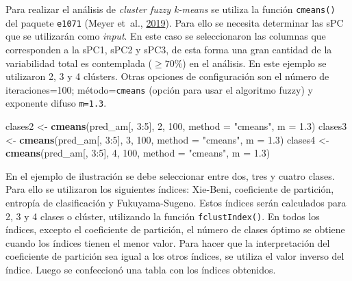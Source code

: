 \documentclass[11pt,b5paper,]{krantz}
\newenvironment{Shaded}{}{}
\newcommand{\DataTypeTok}[1]{\textcolor[rgb]{0.56,0.13,0.00}{#1}}
\newcommand{\DecValTok}[1]{\textcolor[rgb]{0.25,0.63,0.44}{#1}}
\newcommand{\FloatTok}[1]{\textcolor[rgb]{0.25,0.63,0.44}{#1}}
\newcommand{\KeywordTok}[1]{\textcolor[rgb]{0.00,0.44,0.13}{\textbf{#1}}}
\newcommand{\NormalTok}[1]{#1}
\newcommand{\OperatorTok}[1]{\textcolor[rgb]{0.40,0.40,0.40}{#1}}
\newcommand{\StringTok}[1]{\textcolor[rgb]{0.25,0.44,0.63}{#1}}
\begin{document}
Para realizar el análisis de \emph{cluster fuzzy k-means} se utiliza la función \texttt{cmeans()} del paquete \texttt{e1071} (Meyer et~al., \protect\hyperlink{ref-R-e1071}{2019}). Para ello se necesita determinar las sPC que se utilizarán como \emph{input}. En este caso se seleccionaron las columnas que corresponden a la sPC1, sPC2 y sPC3, de esta forma una gran cantidad de la variabilidad total es contemplada (\(\ge 70 \%\)) en el análisis. En este ejemplo se utilizaron 2, 3 y 4 clústers. Otras opciones de configuración son el número de iteraciones=100; método=\texttt{cmeans} (opción para usar el algoritmo fuzzy) y exponente difuso \texttt{m=1.3}.

\begin{Shaded}
\begin{Highlighting}[]
\NormalTok{clases2 <-}\StringTok{ }\KeywordTok{cmeans}\NormalTok{(pred_am[, }\DecValTok{3}\OperatorTok{:}\DecValTok{5}\NormalTok{], }\DecValTok{2}\NormalTok{, }
                  \DecValTok{100}\NormalTok{, }\DataTypeTok{method =} \StringTok{"cmeans"}\NormalTok{, }
                  \DataTypeTok{m =} \FloatTok{1.3}\NormalTok{)}
\NormalTok{clases3 <-}\StringTok{ }\KeywordTok{cmeans}\NormalTok{(pred_am[, }\DecValTok{3}\OperatorTok{:}\DecValTok{5}\NormalTok{], }\DecValTok{3}\NormalTok{, }
                  \DecValTok{100}\NormalTok{, }\DataTypeTok{method =} \StringTok{"cmeans"}\NormalTok{, }
                  \DataTypeTok{m =} \FloatTok{1.3}\NormalTok{)}
\NormalTok{clases4 <-}\StringTok{ }\KeywordTok{cmeans}\NormalTok{(pred_am[, }\DecValTok{3}\OperatorTok{:}\DecValTok{5}\NormalTok{], }\DecValTok{4}\NormalTok{, }
                  \DecValTok{100}\NormalTok{, }\DataTypeTok{method =} \StringTok{"cmeans"}\NormalTok{, }
                  \DataTypeTok{m =} \FloatTok{1.3}\NormalTok{)}
\end{Highlighting}
\end{Shaded}

En el ejemplo de ilustración se debe seleccionar entre dos, tres y cuatro clases. Para ello se utilizaron los siguientes índices: Xie-Beni, coeficiente de partición, entropía de clasificación y Fukuyama-Sugeno. Estos índices serán calculados para 2, 3 y 4 clases o clúster, utilizando la función \texttt{fclustIndex()}. En todos los índices, excepto el coeficiente de partición, el número de clases óptimo se obtiene cuando los índices tienen el menor valor. Para hacer que la interpretación del coeficiente de partición sea igual a los otros índices, se utiliza el valor inverso del índice. Luego se confeccionó una tabla con los índices obtenidos.
\end{document}
